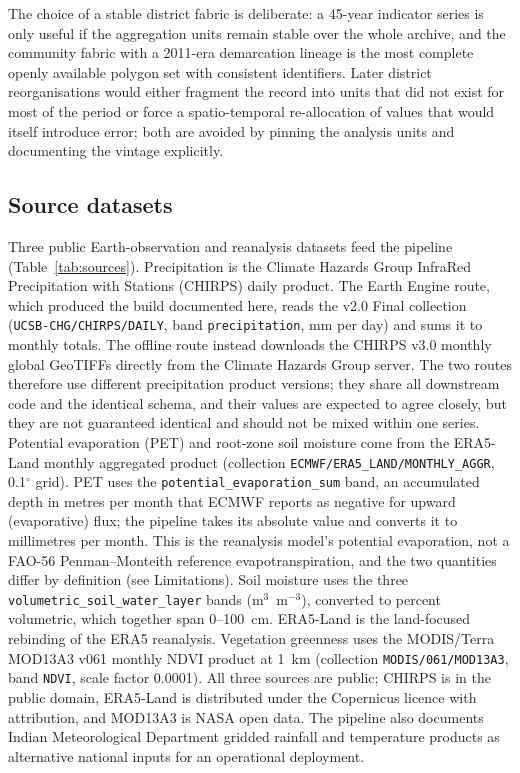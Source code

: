 \documentclass[10pt,a4paper]{article}
\begin{document}
The choice of a stable district fabric is deliberate: a 45-year indicator series is only useful if the aggregation units remain stable over the whole archive, and the community fabric with a 2011-era demarcation lineage is the most complete openly available polygon set with consistent identifiers. Later district reorganisations would either fragment the record into units that did not exist for most of the period or force a spatio-temporal re-allocation of values that would itself introduce error; both are avoided by pinning the analysis units and documenting the vintage explicitly.

\subsection*{Source datasets}
Three public Earth-observation and reanalysis datasets feed the pipeline (Table~\ref{tab:sources}). Precipitation is the Climate Hazards Group InfraRed Precipitation with Stations (CHIRPS) daily product\citep{Funk2015}. The Earth Engine route, which produced the build documented here, reads the v2.0 Final collection (\texttt{UCSB-CHG/CHIRPS/DAILY}, band \texttt{precipitation}, mm per day) and sums it to monthly totals. The offline route instead downloads the CHIRPS v3.0 monthly global GeoTIFFs directly from the Climate Hazards Group server. The two routes therefore use different precipitation product versions; they share all downstream code and the identical schema, and their values are expected to agree closely, but they are not guaranteed identical and should not be mixed within one series. Potential evaporation (PET) and root-zone soil moisture come from the ERA5-Land monthly aggregated product\citep{MunozSabater2021} (collection \texttt{ECMWF/ERA5\_LAND/MONTHLY\_AGGR}, 0.1$^\circ$ grid). PET uses the \texttt{potential\_evaporation\_sum} band, an accumulated depth in metres per month that ECMWF reports as negative for upward (evaporative) flux; the pipeline takes its absolute value and converts it to millimetres per month. This is the reanalysis model's potential evaporation, not a FAO-56 Penman--Monteith reference evapotranspiration, and the two quantities differ by definition (see Limitations). Soil moisture uses the three \texttt{volumetric\_soil\_water\_layer} bands (m$^3$~m$^{-3}$), converted to percent volumetric, which together span 0--100~cm. ERA5-Land is the land-focused rebinding of the ERA5 reanalysis\citep{Hersbach2020}. Vegetation greenness uses the MODIS/Terra MOD13A3 v061 monthly NDVI product at 1~km\citep{Didan2015} (collection \texttt{MODIS/061/MOD13A3}, band \texttt{NDVI}, scale factor 0.0001). All three sources are public; CHIRPS is in the public domain, ERA5-Land is distributed under the Copernicus licence with attribution, and MOD13A3 is NASA open data. The pipeline also documents Indian Meteorological Department gridded rainfall and temperature products\citep{Pai2014,Srivastava2009} as alternative national inputs for an operational deployment.
\end{document}
